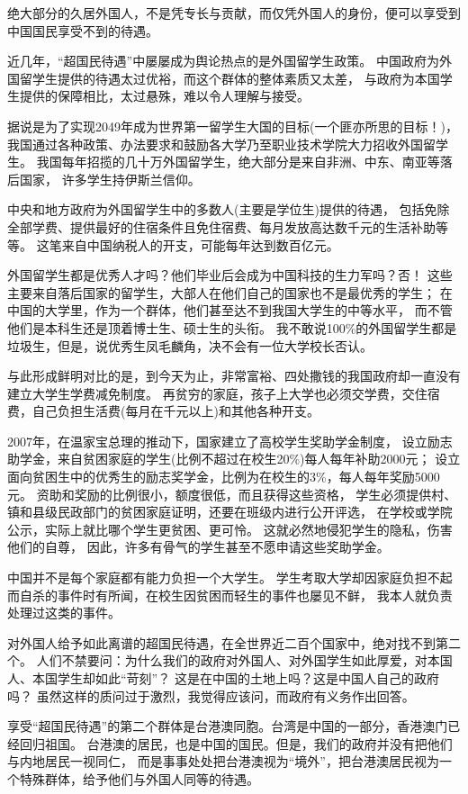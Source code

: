 \documentclass[UTF8, 11pt, oneside]{ctexart}
\begin{document}
绝大部分的久居外国人，不是凭专长与贡献，而仅凭外国人的身份，便可以享受到中国国民享受不到的待遇。

近几年，“超国民待遇”中屡屡成为舆论热点的是外国留学生政策。
中国政府为外国留学生提供的待遇太过优裕，而这个群体的整体素质又太差，
与政府为本国学生提供的保障相比，太过悬殊，难以令人理解与接受。

据说是为了实现2049年成为世界第一留学生大国的目标(一个匪亦所思的目标！)，
我国通过各种政策、办法要求和鼓励各大学乃至职业技术学院大力招收外国留学生。
我国每年招揽的几十万外国留学生，绝大部分是来自非洲、中东、南亚等落后国家，
许多学生持伊斯兰信仰。

中央和地方政府为外国留学生中的多数人(主要是学位生)提供的待遇，
包括免除全部学费、提供最好的住宿条件且免住宿费、每月发放高达数千元的生活补助等等。
这笔来自中国纳税人的开支，可能每年达到数百亿元。

外国留学生都是优秀人才吗？他们毕业后会成为中国科技的生力军吗？否！
这些主要来自落后国家的留学生，大部人在他们自己的国家也不是最优秀的学生；
在中国的大学里，作为一个群体，他们甚至达不到我国大学生的中等水平，
而不管他们是本科生还是顶着博士生、硕士生的头衔。
我不敢说100\%的外国留学生都是垃圾生，但是，说优秀生凤毛麟角，决不会有一位大学校长否认。

与此形成鲜明对比的是，到今天为止，非常富裕、四处撒钱的我国政府却一直没有建立大学生学费减免制度。
再贫穷的家庭，孩子上大学也必须交学费，交住宿费，自己负担生活费(每月在千元以上)和其他各种开支。

2007年，在温家宝总理的推动下，国家建立了高校学生奖助学金制度，
设立励志助学金，来自贫困家庭的学生(比例不超过在校生20\%)每人每年补助2000元；
设立面向贫困生中的优秀生的励志奖学金，比例为在校生的3\%，每人每年奖励5000元。
资助和奖励的比例很小，额度很低，而且获得这些资格，
学生必须提供村、镇和县级民政部门的贫困家庭证明，还要在班级内进行公开评选，
在学校或学院公示，实际上就比哪个学生更贫困、更可怜。
这就必然地侵犯学生的隐私，伤害他们的自尊，
因此，许多有骨气的学生甚至不愿申请这些奖助学金。

中国并不是每个家庭都有能力负担一个大学生。
学生考取大学却因家庭负担不起而自杀的事件时有所闻，在校生因贫困而轻生的事件也屡见不鲜，
我本人就负责处理过这类的事件。

对外国人给予如此离谱的超国民待遇，在全世界近二百个国家中，绝对找不到第二个。
人们不禁要问：为什么我们的政府对外国人、对外国学生如此厚爱，对本国人、本国学生却如此“苛刻”？
这是在中国的土地上吗？这是中国人自己的政府吗？
虽然这样的质问过于激烈，我觉得应该问，而政府有义务作出回答。

享受“超国民待遇”的第二个群体是台港澳同胞。台湾是中国的一部分，香港澳门已经回归祖国。
台港澳的居民，也是中国的国民。但是，我们的政府并没有把他们与内地居民一视同仁，
而是事事处处把台港澳视为“境外”，把台港澳居民视为一个特殊群体，给予他们与外国人同等的待遇。
\end{document}
